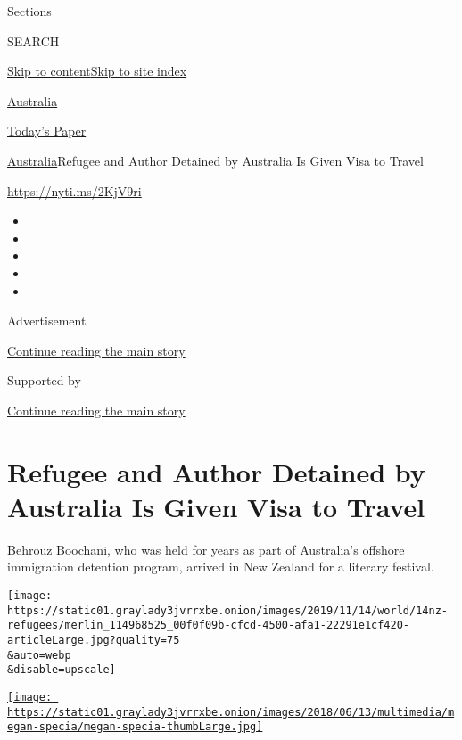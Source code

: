 Sections

SEARCH

\protect\hyperlink{site-content}{Skip to
content}\protect\hyperlink{site-index}{Skip to site index}

\href{https://www.nytimes3xbfgragh.onion/section/world/australia}{Australia}

\href{https://myaccount.nytimes3xbfgragh.onion/auth/login?response_type=cookie\&client_id=vi}{}

\href{https://www.nytimes3xbfgragh.onion/section/todayspaper}{Today's
Paper}

\href{/section/world/australia}{Australia}\textbar{}Refugee and Author
Detained by Australia Is Given Visa to Travel

\url{https://nyti.ms/2KjV9ri}

\begin{itemize}
\item
\item
\item
\item
\item
\end{itemize}

Advertisement

\protect\hyperlink{after-top}{Continue reading the main story}

Supported by

\protect\hyperlink{after-sponsor}{Continue reading the main story}

\hypertarget{refugee-and-author-detained-by-australia-is-given-visa-to-travel}{%
\section{Refugee and Author Detained by Australia Is Given Visa to
Travel}\label{refugee-and-author-detained-by-australia-is-given-visa-to-travel}}

Behrouz Boochani, who was held for years as part of Australia's offshore
immigration detention program, arrived in New Zealand for a literary
festival.

\texttt{[image: https://static01.graylady3jvrrxbe.onion/images/2019/11/14/world/14nz-refugees/merlin\_114968525\_00f0f09b-cfcd-4500-afa1-22291e1cf420-articleLarge.jpg?quality=75\\\&auto=webp\\\&disable=upscale]}

\href{https://www.nytimes3xbfgragh.onion/by/megan-specia}{\texttt{[image: https://static01.graylady3jvrrxbe.onion/images/2018/06/13/multimedia/megan-specia/megan-specia-thumbLarge.jpg]}}

